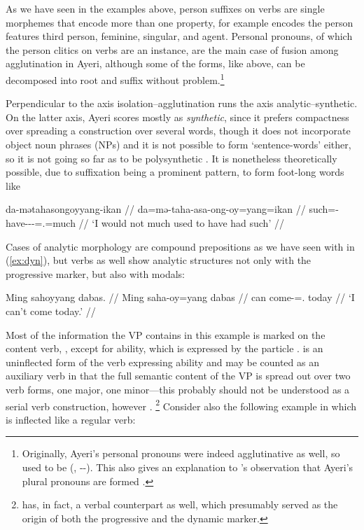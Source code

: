 As we have seen in the examples above, person suffixes on verbs are single 
morphemes that encode more than one property, for example  
encodes the person features third person, feminine, singular, and agent. 
Personal pronouns, of which the person clitics on 
verbs are an instance, are the main case of fusion among agglutination in 
Ayeri, although some of the forms, like  above, can 
be decomposed into root and suffix without problem.\footnote{Originally, 
Ayeri's personal pronouns were indeed agglutinative as well, so 
 used to be  (, 
\Tsg{}-\F{}-\Aarg{}). This also gives an explanation to \citet{boga2016}'s 
observation that Ayeri's plural pronouns are formed .}

Perpendicular to the axis isolation–agglutination runs the axis 
analytic–syn\-thetic. On the latter axis, Ayeri scores mostly as 
\emph{synthetic}, since it prefers compactness over spreading a construction 
over several words, though it does not incorporate object noun phrases (NPs) 
and it is not possible to form `sentence-words' either, so it is not going so 
far as to be poly\-syn\-thetic \citep[45--46]{comrie1989}. It is nonetheless 
theoretically possible, due to suffixation being a prominent pattern, to form 
foot-long words like

\ex\label{ex:footlong}\begingl
	\gla da-mətahasongoyyang-ikan //
	\glb da=mə-taha-asa-ong-oy=yang=ikan //
	\glc such=\Pst{}-have-\Hab{}-\Irr{}-\Neg{}=\Fsg{}.\Aarg{}=much //
	\glft `I would not much used to have had such' //
\endgl\xe

Cases of analytic morphology are compound prepositions as we have seen 
with  in (\ref{ex:dyn}), but verbs as well 
show analytic structures not only with the progressive marker, but also with 
modals:

\ex\begingl
	\gla Ming sahoyyang dabas. //
	\glb Ming saha-oy=yang dabas //
	\glc can come-\Neg{}=\Fsg{}.\Aarg{} today //
	\glft `I can't come today.' //
\endgl\xe

Most of the information the VP contains in this example is marked on the 
content verb, , except for ability, which is expressed 
by the particle .  is an uninflected 
form of the verb expressing ability and may be counted as an auxiliary verb in 
that the full semantic content of the VP is spread out over two verb forms, 
one major, one minor---this probably should not be understood as a 
serial verb construction, however \citep{aikhenvald2006}.%
\footnote{ has, in fact, a verbal counterpart 
 as well, which presumably served as the origin 
of both the progressive and the dynamic marker.\label{fn:mangaverb}} 
Consider also the following example in which  is inflected like 
a regular verb:


